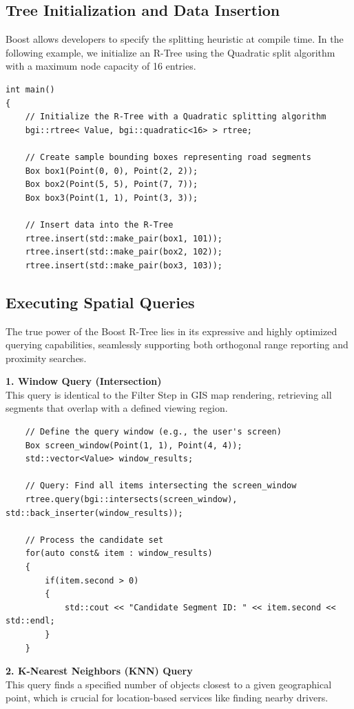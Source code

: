 \documentclass[a4paper, 10pt, titlepage]{report}
\begin{document}
\subsection{Tree Initialization and Data Insertion}
Boost allows developers to specify the splitting heuristic at compile time. In the following example, we initialize an R-Tree using the Quadratic split algorithm with a maximum node capacity of 16 entries.

\begin{verbatim}
int main()
{
    // Initialize the R-Tree with a Quadratic splitting algorithm
    bgi::rtree< Value, bgi::quadratic<16> > rtree;

    // Create sample bounding boxes representing road segments
    Box box1(Point(0, 0), Point(2, 2));
    Box box2(Point(5, 5), Point(7, 7));
    Box box3(Point(1, 1), Point(3, 3));

    // Insert data into the R-Tree
    rtree.insert(std::make_pair(box1, 101));
    rtree.insert(std::make_pair(box2, 102));
    rtree.insert(std::make_pair(box3, 103));
\end{verbatim}

\subsection{Executing Spatial Queries}
The true power of the Boost R-Tree lies in its expressive and highly optimized querying capabilities, seamlessly supporting both orthogonal range reporting and proximity searches.

\textbf{1. Window Query (Intersection)} \\
This query is identical to the Filter Step in GIS map rendering, retrieving all segments that overlap with a defined viewing region.

\begin{verbatim}
    // Define the query window (e.g., the user's screen)
    Box screen_window(Point(1, 1), Point(4, 4));
    std::vector<Value> window_results;

    // Query: Find all items intersecting the screen_window
    rtree.query(bgi::intersects(screen_window), std::back_inserter(window_results));

    // Process the candidate set
    for(auto const& item : window_results)
    {
        if(item.second > 0)
        {
            std::cout << "Candidate Segment ID: " << item.second << std::endl;
        }
    }
\end{verbatim}

\textbf{2. K-Nearest Neighbors (KNN) Query} \\
This query finds a specified number of objects closest to a given geographical point, which is crucial for location-based services like finding nearby drivers.
\end{document}

